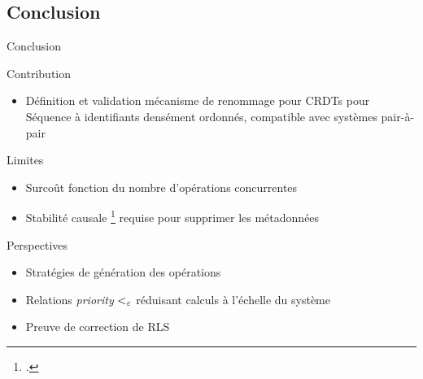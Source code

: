 \subsection{Conclusion}

\begin{frame}{Conclusion}
  \begin{block}{Contribution}
    \begin{itemize}
      \item Définition et validation mécanisme de renommage pour CRDTs pour Séquence à identifiants densément ordonnés, compatible avec systèmes pair-à-pair
    \end{itemize}
  \end{block}
  \pause
  \begin{block}{Limites}
    \begin{itemize}
      \item Surcoût fonction du nombre d'opérations \ren concurrentes
      \item Stabilité causale \footcite{baquero2017pure} requise pour supprimer les métadonnées
    \end{itemize}
  \end{block}
  \pause
  \begin{block}{Perspectives}
    \begin{itemize}
      \item Stratégies de génération des opérations \ren
      \item Relations \emph{priority} $<_{\varepsilon}$ réduisant calculs à l'échelle du système
      \item Preuve de correction de RLS
    \end{itemize}
  \end{block}
\end{frame}
